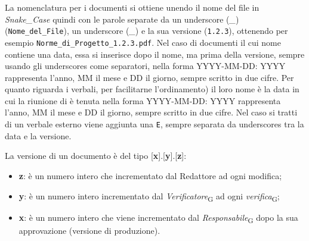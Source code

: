 La nomenclatura per i documenti si ottiene unendo il nome del file in \textit{Snake\_Case} quindi con le parole separate da un underscore (\textit{\_}) (\texttt{Nome\_del\_File}), un underscore (\textit{\_}) e la sua versione (\texttt{1.2.3}), ottenendo per esempio \texttt{Norme\_di\allowbreak{}\_Progetto\_1.2.3.pdf}. Nel caso di documenti il cui nome contiene una data, essa si inserisce dopo il nome, ma prima della versione, sempre usando gli underscores come separatori, nella forma YYYY-MM-DD: YYYY rappresenta l'anno, MM il mese e DD il giorno, sempre scritto in due cifre.
Per quanto riguarda i  verbali, per facilitarne l'ordinamento) il loro nome è la data in cui la riunione di è tenuta nella forma YYYY-MM-DD: YYYY rappresenta l'anno, MM il mese e DD il giorno, sempre scritto in due cifre. Nel caso si tratti di un verbale esterno viene aggiunta una \texttt{E}, sempre separata da underscores tra la data e la versione.


La versione di un documento è del tipo [\textbf{x}].[\textbf{y}].[\textbf{z}]:
\begin{itemize}
    \item \textbf{z}: è un numero intero che incrementato dal Redattore ad ogni modifica;
    \item \textbf{y}: è un numero intero incrementato dal \textit{Verificatore}\textsubscript{G} ad ogni \textit{verifica}\textsubscript{G};
    \item \textbf{x}: è un numero intero che viene incrementato dal \textit{Responsabile}\textsubscript{G} dopo la sua approvazione (versione di produzione).
\end{itemize}

